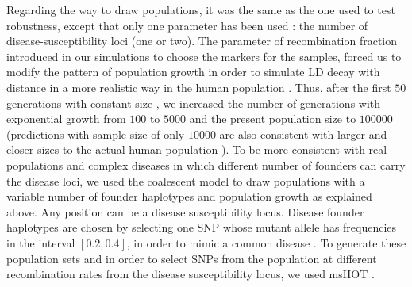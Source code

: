 \documentclass[runningheads]{/home/mabad/conferences/LNCS/llncs}
\begin{document}
Regarding the way to draw populations, it was the same as the one used to test robustness, except that only one parameter has been used \cite{Lam.zz.2000,Zhang.zz.2003,Yu.zz.2005}: the number of disease-susceptibility loci (one or two). The parameter of recombination fraction introduced in our simulations to choose the markers for the samples, forced us to modify the pattern of population growth in order  to simulate LD decay with distance in a more realistic way in the human population \cite{Kruglyak.99,Crawford.zz.2004}. Thus, after the first $50$ generations with constant size \cite{Lam.zz.2000,Zhang.zz.2003,Yu.zz.2005}, we increased the number of generations with exponential growth from $100$ to $5000$ and the present population size to $100000$ (predictions with sample size of only $10000$ are also consistent with larger and closer sizes to the actual human population \cite{Kruglyak.99}). 
To be more consistent with real populations and complex diseases in which different number of founders can carry the disease loci, we used the coalescent model \cite{Nordborg.2001} to draw populations with a variable number of founder haplotypes and population growth as explained above.
Any position can be a disease susceptibility locus. Disease founder haplotypes are chosen by selecting one SNP whose mutant allele has frequencies in the interval $[0.2, 0.4]$, in order to mimic a common disease \cite{Yu.zz.2005}. To generate these population sets and in order to select SNPs from the population at different recombination rates from the disease susceptibility locus, we used msHOT \cite{Hellenthal.Stephens.2007}.    
\end{document}
